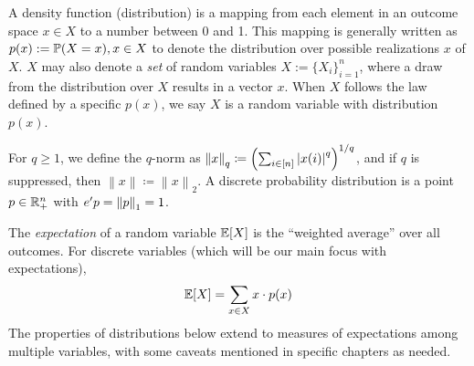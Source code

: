 
A density function (distribution) is a mapping from each element in an outcome space $x \in X$ to a number between 0 and 1.
This mapping is generally written as $p(x):=\mathbb{P}(X=x), x \in X$ to denote the distribution over possible realizations $x$ of $X$.
$X$ may also denote a \textit{set} of random variables $X:=\{X_i\}_{i=1}^n$, where a draw from the distribution over $X$ results in a vector $x$. When $X$ follows the law defined by a specific $p(x)$, we say $X$ is a random variable with distribution $p(x)$.

For $q\geq 1$, we define the $q$-norm  as $\left\|x\right\|_q\coloneqq \left(\sum_{i\in[n]}\left|{x(i)}\right|^{q}\right)^{1/q}$, and if $q$ is suppressed, then $\left\|x\right\|\coloneqq \left\|x\right\|_2$. 
A discrete probability distribution is a point $p\in\mathbb{R}^{n}_+$ with $e'p=\left\|p\right\|_1=1$.

The \textit{expectation} of a random variable $\mathbb{E}[X]$ is the ``weighted average'' over all outcomes. For discrete variables (which will be our main focus with expectations), 
\begin{align}
\mathbb{E}[X] = \sum_{x\in X} x\cdot p(x)
\end{align}
The properties of distributions below extend to measures of expectations among multiple variables, with some caveats mentioned in specific chapters as needed.

